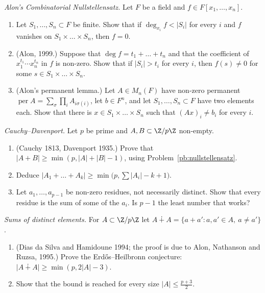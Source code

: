 \begin{exercise}[$\star\star$]\label{pb:nullstellensatz}
\emph{Alon's Combinatorial Nullstellensatz.} Let $F$ be a field and $f\in F[x_1,\dots,x_n]$.
\begin{enumerate}[label=(\alph*)]
\item Let $S_1,\dots,S_n\subset F$ be finite. Show that if $\deg_{x_i}f<|S_i|$ for every $i$ and $f$ vanishes on
$S_1\times\dots\times S_n$, then $f=0$.
\item (Alon, 1999.) Suppose that $\deg f=t_1+\dots+t_n$ and that the coefficient of $x_1^{t_1}\cdots x_n^{t_n}$ in $f$ is non-zero.
Show that if $|S_i|>t_i$ for every $i$, then $f(s)\ne0$ for some $s\in S_1\times\dots\times S_n$.
\item (Alon's permanent lemma.) Let $A\in M_n(F)$ have non-zero permanent $\operatorname{per}A=\sum_\sigma\prod_iA_{i\sigma(i)}$,
let $b\in F^n$, and let $S_1,\dots,S_n\subset F$ have two elements each. Show that there is $x\in S_1\times\dots\times S_n$ such
that $(Ax)_i\ne b_i$ for every $i$.
\end{enumerate}
\end{exercise}

\begin{exercise}[$\star\star$]\label{pb:cauchydav}
\emph{Cauchy--Davenport.} Let $p$ be prime and $A,B\subset\Z/p\Z$ non-empty.
\begin{enumerate}[label=(\alph*)]
\item (Cauchy 1813, Davenport 1935.) Prove that $|A+B|\ge\min(p,|A|+|B|-1)$, using Problem~\ref{pb:nullstellensatz}.
\item Deduce $|A_1+\dots+A_k|\ge\min\bigl(p,\sum|A_i|-k+1\bigr)$.
\item Let $a_1,\dots,a_{p-1}$ be non-zero residues, not necessarily distinct. Show that every residue is the sum of some of the
$a_i$. Is $p-1$ the least number that works?
\end{enumerate}
\end{exercise}

\begin{exercise}[$\star\star\star$]\label{pb:erdosheil}
\emph{Sums of distinct elements.} For $A\subset\Z/p\Z$ let $A\dotplus A=\{a+a':a,a'\in A,\ a\ne a'\}$.
\begin{enumerate}[label=(\alph*)]
\item (Dias da Silva and Hamidoune 1994; the proof is due to Alon, Nathanson and Ruzsa, 1995.) Prove the Erdős--Heilbronn
conjecture: $|A\dotplus A|\ge\min(p,2|A|-3)$.
\item Show that the bound is reached for every size $|A|\le\frac{p+3}2$.
\end{enumerate}
\end{exercise}

